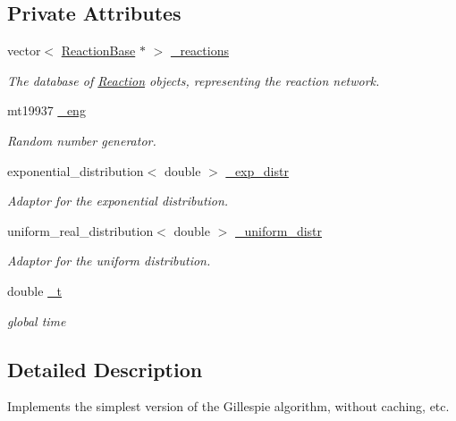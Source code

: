 \subsection*{Private Attributes}
\begin{DoxyCompactItemize}
\item 
vector$<$ \hyperlink{classReactionBase}{Reaction\+Base} $\ast$ $>$ \hyperlink{classChemSimpleGillespieImpl_a5f852154e8298303a41f33fc5d77a3c7}{\+\_\+reactions}
\begin{DoxyCompactList}\small\item\em The database of \hyperlink{classReaction}{Reaction} objects, representing the reaction network. \end{DoxyCompactList}\item 
mt19937 \hyperlink{classChemSimpleGillespieImpl_a6f236c80a1fe061e667f45aa36ff8744}{\+\_\+eng}
\begin{DoxyCompactList}\small\item\em Random number generator. \end{DoxyCompactList}\item 
exponential\+\_\+distribution$<$ double $>$ \hyperlink{classChemSimpleGillespieImpl_a87869183785fdf1117241ddc72717d3d}{\+\_\+exp\+\_\+distr}
\begin{DoxyCompactList}\small\item\em Adaptor for the exponential distribution. \end{DoxyCompactList}\item 
uniform\+\_\+real\+\_\+distribution$<$ double $>$ \hyperlink{classChemSimpleGillespieImpl_a7dcca7be34a807bc6e9fbc7002207456}{\+\_\+uniform\+\_\+distr}
\begin{DoxyCompactList}\small\item\em Adaptor for the uniform distribution. \end{DoxyCompactList}\item 
double \hyperlink{classChemSimpleGillespieImpl_a3ecc9f9f89d6fe3f543ee71a5a619974}{\+\_\+t}
\begin{DoxyCompactList}\small\item\em global time \end{DoxyCompactList}\end{DoxyCompactItemize}


\subsection{Detailed Description}
Implements the simplest version of the Gillespie algorithm, without caching, etc. 

